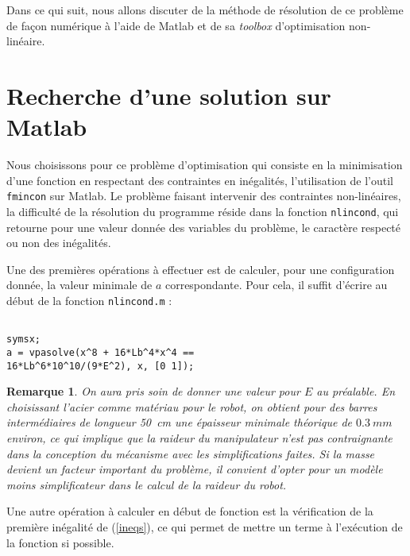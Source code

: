 \documentclass{article}
\newtheorem*{remark}{Remarque}
\begin{document}
\begin{multicols*}{2}
Dans ce qui suit, nous allons discuter de la méthode de résolution de ce problème de façon numérique à l'aide
de Matlab et de sa \textit{toolbox} d'optimisation non-linéaire. 

\section*{Recherche d'une solution sur Matlab}

Nous choisissons pour ce problème d'optimisation qui consiste en la minimisation d'une fonction en respectant des contraintes en inégalités, l'utilisation de l'outil \texttt{fmincon} sur Matlab. Le problème faisant intervenir des contraintes non-linéaires, la difficulté de la résolution du programme réside dans la fonction \texttt{nlincond}, qui retourne pour une valeur donnée des variables du problème, le caractère respecté ou non des inégalités.

\bigskip

Une des premières opérations à effectuer est de calculer, pour une configuration donnée, la valeur minimale de $a$ correspondante. Pour cela, il suffit d'écrire au début de la fonction \texttt{nlincond.m} :

\bigskip

\begin{verbatim}
 
symsx;
a = vpasolve(x^8 + 16*Lb^4*x^4 ==
16*Lb^6*10^10/(9*E^2), x, [0 1]);
\end{verbatim}

\begin{remark}
On aura pris soin de donner une valeur pour $E$ au préalable. En choisissant l'acier comme matériau pour le robot, on obtient pour des barres intermédiaires de longueur \SI{50}{cm} une épaisseur minimale théorique de $\SI{0.3}{mm}$ environ, ce qui implique que la raideur du manipulateur n'est pas contraignante dans la conception du mécanisme avec les simplifications faites. Si la masse devient un facteur important du problème, il convient d'opter pour un modèle moins simplificateur dans le calcul de la raideur du robot.
\end{remark}

Une autre opération à calculer en début de fonction est la vérification de la première inégalité de (\ref{ineqs}), ce qui permet de mettre un terme à l'exécution de la fonction si possible. 


\end{multicols*}
\end{document}
